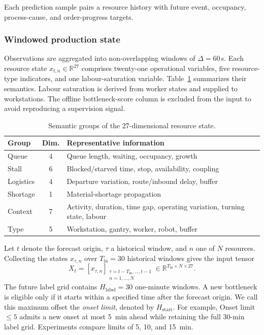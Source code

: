 \documentclass[a4paper,fleqn]{cas-dc}
\begin{document}
Each prediction sample pairs a resource history with future event, occupancy, process-cause, and order-progress targets.

\subsubsection{Windowed production state}

Observations are aggregated into non-overlapping windows of $\Delta=60$\,s. Each resource state $x_{t,n}\in\mathbb{R}^{27}$ comprises twenty-one operational variables, five resource-type indicators, and one labour-saturation variable. Table~\ref{tab:feature-groups} summarizes their semantics. Labour saturation is derived from worker states and supplied to workstations. The offline bottleneck-score column is excluded from the input to avoid reproducing a supervision signal.

\begin{table}[pos=t]
\centering
\caption{Semantic groups of the 27-dimensional resource state.}
\label{tab:feature-groups}
\scriptsize
\setlength{\tabcolsep}{3pt}
\renewcommand{\arraystretch}{1.12}
\begin{tabularx}{\columnwidth}{@{}l c >{\raggedright\arraybackslash}X@{}}
\toprule
Group & Dim. & Representative information \\
\midrule
Queue & 4 & Queue length, waiting, occupancy, growth \\
Stall & 6 & Blocked/starved time, stop, availability, coupling \\
Logistics & 4 & Departure variation, route/inbound delay, buffer \\
Shortage & 1 & Material-shortage propagation \\
Context & 7 & Activity, duration, time gap, operating variation, turning state, labour \\
Type & 5 & Workstation, gantry, worker, robot, buffer \\
\bottomrule
\end{tabularx}
\end{table}

Let $t$ denote the forecast origin, $\tau$ a historical window, and $n$ one of $N$ resources. Collecting the states $x_{\tau,n}$ over $T_{\mathrm{in}}=30$ historical windows gives the input tensor
\begin{equation}
X_t=\left[x_{\tau,n}\right]_
{\substack{\tau=t-T_{\mathrm{in}},\ldots,t-1\\n=1,\ldots,N}}
\in\mathbb{R}^{T_{\mathrm{in}}\times N\times 27}.
\end{equation}
The future label grid contains $H_{\mathrm{label}}=30$ one-minute windows. A new bottleneck is eligible only if it starts within a specified time after the forecast origin. We call this maximum offset the \emph{onset limit}, denoted by $H_{\mathrm{start}}$. For example, Onset limit~$\leq5$ admits a new onset at most 5~min ahead while retaining the full 30-min label grid. Experiments compare limits of 5, 10, and 15~min.
\end{document}
